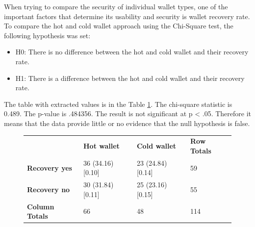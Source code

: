 \documentclass[
  printed, %
  table,   %
  lof,     %
  lot,     %
           oneside, color
]{fithesis3}
\begin{document}
When trying to compare the security of individual wallet types, one of the important factors that determine its usability and security is wallet recovery rate. To compare the hot and cold wallet approach using the Chi-Square test, the following hypothesis was set:
\begin{itemize}\itemsep0em
\item H0: There is no difference between the hot and cold wallet and their recovery rate.
\item H1: There is a difference between the hot and cold wallet and their recovery rate.
\end{itemize}
The table with extracted values is in the Table \ref{table:user-chi}. The chi-square statistic is 0.489. The p-value is .484356. The result is not significant at p < .05. Therefore it means that the data provide little or no evidence that the null hypothesis is false. 

\begin{figure}[H]
\centering

\begin{tabular}{llll}
                       & \textbf{Hot wallet}            & \textbf{Cold wallet}           & \textbf{Row Totals} \\
\textbf{Recovery yes}  & 36  (34.16)  {[}0.10{]} & 23  (24.84)  {[}0.14{]} & 59                  \\
\textbf{Recovery no}   & 30  (31.84)  {[}0.11{]} & 25  (23.16)  {[}0.15{]} & 55                  \\
\textbf{Column Totals} & 66                      & 48                      & 114
\end{tabular}


\label{table:user-chi}
\end{figure}
\end{document}
